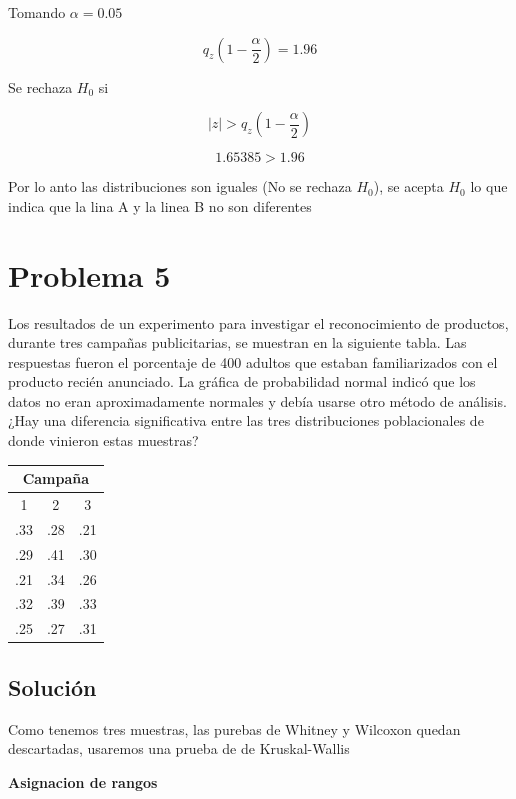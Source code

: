 \documentclass{article}
\begin{document}
Tomando $\alpha = 0.05$

\[q_z(1 - \frac{\alpha}{2}) = 1.96\]

Se rechaza $H_0$ si

\[|z| > q_z(1-\frac{\alpha}{2})\]

\[1.65385 > 1.96\]

Por lo anto las distribuciones son iguales (No se rechaza $H_0$), se acepta $H_0$ lo que indica que la lina A y la linea B no son diferentes

\section{Problema 5}
Los resultados de un experimento para investigar el reconocimiento de productos, durante tres campañas publicitarias, se muestran en la siguiente tabla. Las respuestas fueron el porcentaje de 400 adultos que estaban familiarizados con el producto recién anunciado. La gráfica de probabilidad normal indicó que los datos no eran aproximadamente normales y debía usarse otro método de análisis. ¿Hay una diferencia significativa entre las tres distribuciones poblacionales de donde vinieron estas muestras?

\begin{center}
    \begin{tabular}{c |c |c}
        \multicolumn{3}{c}{Campaña} \\
        \hline
        1   & 2   & 3               \\
        .33 & .28 & .21             \\
        .29 & .41 & .30             \\
        .21 & .34 & .26             \\
        .32 & .39 & .33             \\
        .25 & .27 & .31             \\
    \end{tabular}
\end{center}

\subsection*{Solución}

Como tenemos tres muestras, las purebas de Whitney y Wilcoxon quedan descartadas, usaremos una prueba de de Kruskal-Wallis

\textbf{Asignacion de rangos}
\end{document}
